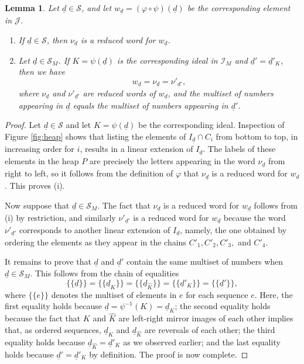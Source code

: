 \documentclass[11pt]{amsart}
\theoremstyle{plain}
\newtheorem{lemma}[theorem]{Lemma}
\theoremstyle{definition}
\theoremstyle{remark}
\numberwithin{equation}{section}
\newcommand{\mset}[1]{\{\!\{#1\}\!\}}
\newcommand{\seqd}{\underline{d}}
\newcommand{\cali}{\mathcal{I}}
\newcommand{\calj}{\mathcal{J}}
\newcommand{\cals}{\mathcal{S}}
\newcommand{\inverse}{^{-1}}
\begin{document}
\begin{lemma}
\label{lem:d_d'}
Let $\seqd\in \cals$, and let $w_{\seqd}=(\varphi\circ\psi)(\seqd)$ be the corresponding element
in $\calj$.
\begin{enumerate}
  \item If $\seqd\in \cals$, then $\nu_{\seqd}$ is a reduced word for $w_{\seqd}$.
\item Let $\seqd\in \cals_M$. If $K=\psi(\seqd)$ is the corresponding ideal in
  $\cali_M$ and $\seqd'=\seqd'_K$, then we have   
\begin{equation}
\label{eq:lin_ext}
w_{\seqd}=\nu_{\seqd}=\nu'_{\seqd'},
\end{equation}
where $\nu_{\seqd}$ and $\nu'_{\seqd'}$ are reduced words of $w_{\seqd}$,  
  and the multiset of numbers appearing in $\seqd$ equals the
  multiset of numbers appearing in $\seqd'$.  
\end{enumerate}
\end{lemma}

\begin{proof}
Let $\seqd\in \cals$ and let $K=\psi(\seqd)$ be the corresponding ideal. Inspection of
Figure \ref{fig:heap} shows that listing the elements of $I_{\seqd}\cap C_i$ from
bottom to top, in increasing order for $i$, results in a linear extension of
$I_{\seqd}$. The labels of these elements in the heap $P$ are precisely the letters
appearing in the word $\nu_{\seqd}$ from right to left, so it follows from the
definition of $\varphi$ that $\nu_{\seqd}$ is a reduced word for $w_d$. This proves (i).

Now suppose that $\seqd\in \cals_M$. The fact that $\nu_{\seqd}$ is a reduced word for
$w_{\seqd}$ follows from (i) by restriction, and similarly $\nu'_{\seqd'}$ is a reduced word
for $w_{\seqd}$ because the word $\nu'_{\seqd'}$ corresponds to another linear extension
of $I_{\seqd}$, namely, the one obtained by ordering the elements as they appear in
the chains $C'_1, C'_2, C'_3,$ and $C'_4$. 


It remains to prove that $\seqd$ and $\seqd'$ contain the same multiset of numbers when
$\seqd\in \cals_M$. This follows from the chain of equalities
\[
  \mset{\seqd}=\mset{\seqd_K}=\mset{\seqd_{\hat K}}=\mset{\seqd'_{K}}=\mset{\seqd'}, 
\]
where $\mset{e}$ denotes the multiset of elements in $e$ for each sequence $e$.
Here, the first equality holds because $\seqd=\psi\inverse(K)=\seqd_K$; the
second equality holds because the fact that $K$ and $\hat K$ are left-right
mirror images of each other implies that, as ordered sequences, $\seqd_K$ and
$\seqd_{\hat K}$ are reversals of each other; the third equality holds because
$\seqd_{\hat K}=\seqd'_{K}$ as we observed earlier; and the last equality holds
because $\seqd'=\seqd'_K$ by definition. The proof is now complete. \end{proof}
\end{document}
